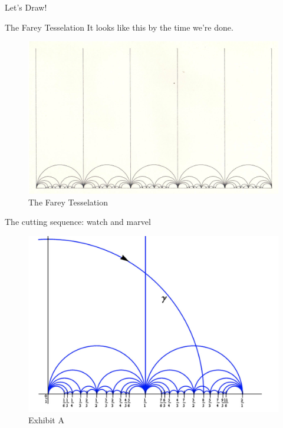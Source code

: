 \documentclass[serif]{beamer}
\begin{document}
\begin{frame}{Let's Draw!}
    
\end{frame}

\begin{frame}{The Farey Tesselation}
    It looks like this by the time we're done.
    \begin{figure}
        \centering
        \includegraphics[scale=0.25]{pics/farey.png}
        \caption{The Farey Tesselation}
    \end{figure}
\end{frame}

\begin{frame}{The cutting sequence: watch and marvel}
    \begin{figure}
        \centering
        \includegraphics[scale=0.25]{pics/firstex.png}
        \caption{Exhibit A}
    \end{figure}
\end{frame}
\end{document}
